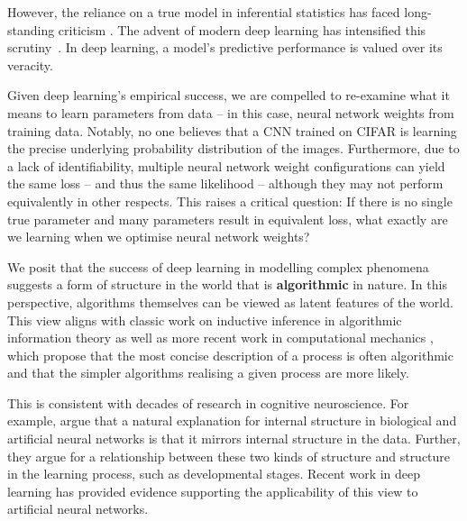 However, the reliance on a true model in inferential statistics has faced long-standing criticism \citep{rissanen1998stochastic,breiman2001statistical,cox2006principles}. The advent of modern deep learning has intensified this scrutiny~\citep{sejnowski2020unreasonable}. In deep learning, a model's predictive performance is valued over its veracity.

Given deep learning's empirical success, we are compelled to re-examine what it means to learn parameters from data -- in this case, neural network weights from training data. Notably, no one believes that a CNN trained on CIFAR is learning the precise underlying probability distribution of the images. Furthermore, due to a lack of identifiability, %
multiple neural network weight configurations can yield the same loss -- and thus the same likelihood -- although they may not perform equivalently in other respects. This raises a critical question: If there is no single true parameter and many parameters result in equivalent loss, what exactly are we learning when we optimise neural network weights?

We posit that the success of deep learning in modelling complex phenomena suggests a form of structure in the world that is \textbf{algorithmic} in nature.
In this perspective, algorithms themselves can be viewed as latent features of the world. This view aligns with classic work on inductive inference in algorithmic information theory \citep{solomonoff1964formal} as well as more recent work in computational mechanics \citep{crutchfield2012between}, which propose that the most concise description of a process is often algorithmic and that the simpler algorithms realising a given process are more likely.

This is consistent with decades of research in cognitive neuroscience. For example, \citet{rogers2004semantic} argue that a natural explanation for internal structure in biological and artificial neural networks is that it mirrors internal structure in the data. Further, they argue for a relationship between these two kinds of structure and structure in the learning process, such as developmental stages. Recent work in deep learning \citep{saxe2019mathematical,hoogland2024developmental,wang2024differentiation} has provided evidence supporting the applicability of this view to artificial neural networks.

